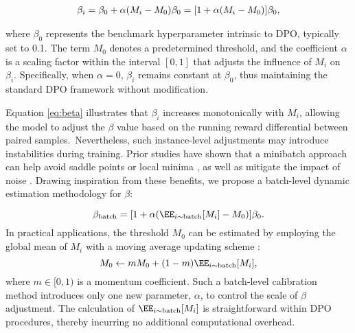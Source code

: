\begin{eqnarray}
    \begin{aligned}
        \beta_i = \beta_0 + \alpha \large(M_i - M_0 \large) \beta_0 = [1 + \alpha(M_i-M_0)]\beta_0,
    \end{aligned}
    \label{eq:beta}
\end{eqnarray}

where $\beta_0$ represents the benchmark hyperparameter intrinsic to DPO, typically set to 0.1. The term $M_0$ denotes a predetermined threshold, and the coefficient $\alpha$ is a scaling factor within the interval $[0, 1]$ that adjusts the influence of $M_i$ on $\beta_i$. Specifically, when $\alpha = 0$, $\beta_i$ remains constant at $\beta_0$, thus maintaining the standard DPO framework without modification.

Equation \eqref{eq:beta} illustrates that $\beta_i$ increases monotonically with $M_i$, allowing the model to adjust the $\beta$ value based on the running reward differential between paired samples.\
Nevertheless, such instance-level adjustments may introduce instabilities during training. Prior studies have shown that a minibatch approach can help avoid saddle points or local minima \cite{ge2015escaping}, as well as mitigate the impact of noise \cite{robbins1951stochastic, bottou2010large}. Drawing inspiration from these benefits, we propose a batch-level dynamic estimation methodology for $\beta$:

\begin{equation}
    \beta_{\text{batch}} = [1 + \alpha( \EE_{i \sim \text{batch}}[M_i]-M_0)]\beta_0.
\end{equation}
In practical applications, the threshold $M_0$ can be estimated by employing the global mean of $M_i$ with a moving average updating scheme \cite{mae}:
\begin{equation}
    M_0  \leftarrow m M_0 + (1-m)  \EE_{i \sim \text{batch}}[M_i],
    \label{mom}
\end{equation}
where $m\in[0,1)$ is a momentum coefficient.
Such a batch-level calibration method introduces only one new parameter, $\alpha$, to control the scale of $\beta$ adjustment.
The calculation of $\EE_{i \sim \text{batch}}[M_i]$ is straightforward within DPO procedures, thereby incurring no additional computational overhead.

